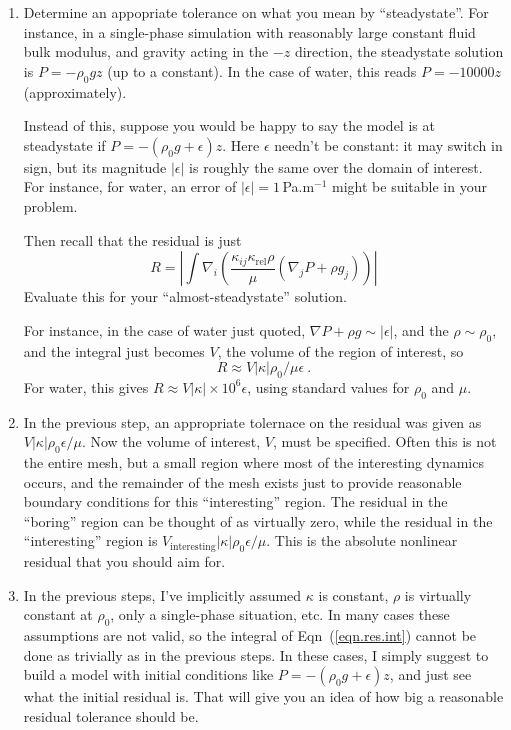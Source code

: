 \documentclass[12pt]{report}
\begin{document}
\begin{enumerate}
\item Determine an appopriate tolerance on what you mean by
  ``steadystate''.  For instance, in a single-phase simulation with
  reasonably large constant fluid bulk modulus, and gravity acting in
  the $-z$ direction, the steadystate solution is $P = -\rho_{0}gz$
  (up to a constant).  In the case of water, this reads $P=-10000z$
  (approximately).

  Instead of this, suppose you would be happy to say the model is at
  steadystate if $P = -(\rho_{0} g + \epsilon)z$.  Here $\epsilon$
  needn't be constant: it may switch in sign, but its magnitude
  $|\epsilon|$ is roughly the same over the domain of interest.  For instance, for
  water, an error of 
  $|\epsilon|=1$\,Pa.m$^{-1}$ might be suitable in your problem.

Then recall
  that the residual is just
\begin{equation}
R = \left|\int
\nabla_{i}\left(\frac{\kappa_{ij}\kappa_{\mathrm{rel}}\rho}{\mu}(\nabla_{j}P
+ \rho g_{j}) \right) \right|
\label{eqn.res.int}
\end{equation}
Evaluate this for your ``almost-steadystate'' solution.

For instance, in the
case of water just quoted, $\nabla P + \rho g \sim |\epsilon|$, and
the $\rho\sim\rho_{0}$, and the integral just becomes $V$, the volume
of the region of interest, so
\begin{equation}
R \approx V|\kappa|\rho_{0}/\mu\epsilon \ .
\end{equation}
For water, this gives $R \approx V|\kappa|\times 10^{6}\epsilon$,
using standard values for $\rho_{0}$ and $\mu$.
\item In the previous step, an appropriate tolernace on the residual
  was given as $V|\kappa|\rho_{0}\epsilon/\mu$.  Now the volume of
  interest, $V$, must be specified.  Often this is not the entire
  mesh, but a small region where most of the interesting dynamics occurs, and the
  remainder of the mesh exists just to provide reasonable boundary
  conditions for this ``interesting'' region.  The residual in the
  ``boring'' region can be thought of as virtually zero, while the
  residual in the ``interesting'' region is
  $V_{\mathrm{interesting}}|\kappa|\rho_{0}\epsilon/\mu$.  This is the
  absolute nonlinear residual that you should aim for.
\item In the previous steps, I've implicitly assumed $\kappa$ is
  constant, $\rho$ is virtually constant at $\rho_{0}$, only a
  single-phase situation, etc.  In many cases these assumptions are
  not valid, so the integral of Eqn~(\ref{eqn.res.int}) cannot be done
  as trivially as in the previous steps.  In these cases, I simply
  suggest to build a model with initial conditions like $P =
  -(\rho_{0} g + \epsilon)z$, and just see what the initial residual is.
  That will give you an idea of how big a reasonable residual
  tolerance should be.
\end{enumerate}
\end{document}
